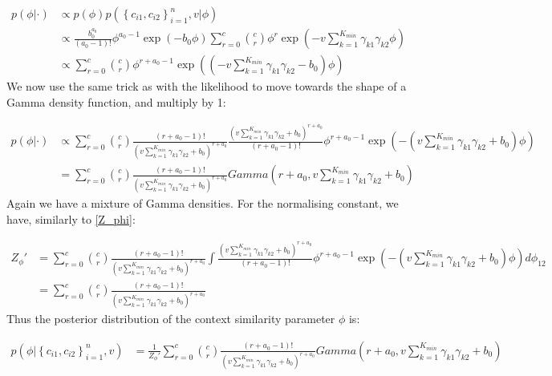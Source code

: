 \documentclass[11pt]{article} %
\begin{document}
\begin{align}
p(\phi | \cdot) &\propto p(\phi) p(\left\{c_{i1}, c_{i2}\right\}_{i=1}^n, v | \phi)  \\
&\propto \frac{b_0^{a_0}}{(a_0 - 1)!}\phi^{a_0 - 1}\exp\left(-b_0 \phi \right)  \sum_{r=0}^c  \binom{c}{r}\phi^r \exp\left(-v \sum_{k=1}^{K_{min}} \gamma_{k1} \gamma_{k2}\phi\right) \\
&\propto \sum_{r=0}^c  \binom{c}{r} \phi^{r + a_0 - 1} \exp \left( \left(-v \sum_{k=1}^{K_{min}} \gamma_{k1} \gamma_{k2}  -b_0 \right)\phi\right)
\end{align}
We now use the same trick as with the likelihood to move towards the shape of a Gamma density function, and multiply by 1:

\begin{align}
p(\phi | \cdot) &\propto \sum_{r=0}^c  \binom{c}{r} \frac{(r + a_0 - 1)!}{ \left(v \sum_{k=1}^{K_{min}} \gamma_{k1} \gamma_{k2} + b_0 \right)^{r + a_0}} \frac{ \left(v \sum_{k=1}^{K_{min}} \gamma_{k1} \gamma_{k2} + b_0 \right)^{r + a_0}}{(r + a_0 - 1)!} \phi^{r + a_0 - 1} \exp \left( - \left(v \sum_{k=1}^{K_{min}} \gamma_{k1} \gamma_{k2} + b_0 \right)\phi\right) \\
&= \sum_{r=0}^c  \binom{c}{r} \frac{(r + a_0 - 1)!}{ \left(v \sum_{k=1}^{K_{min}} \gamma_{k1} \gamma_{k2} + b_0 \right)^{r + a_0}} Gamma \left(r+ a_0, v \sum_{k=1}^{K_{min}} \gamma_{k1} \gamma_{k2} + b_0 \right)
\end{align}
Again we have a mixture of Gamma densities. For the normalising constant, we have, similarly to \eqref{Z_phi}:

\begin{align}
Z_{\phi}' &=\sum_{r=0}^c  \binom{c}{r} \frac{(r + a_0 - 1)!}{ \left(v \sum_{k=1}^{K_{min}} \gamma_{k1} \gamma_{k2} + b_0 \right)^{r + a_0}}  \int \frac{ \left(v \sum_{k=1}^{K_{min}} \gamma_{k1} \gamma_{k2} + b_0 \right)^{r + a_0}}{(r + a_0 - 1)!} \phi^{r + a_0 - 1} \exp \left( - \left(v \sum_{k=1}^{K_{min}} \gamma_{k1} \gamma_{k2} + b_0 \right)\phi\right) d\phi_{12} \\
&= \sum_{r=0}^c \binom{c}{r} \frac{(r + a_0 - 1)!}{ \left(v \sum_{k=1}^{K_{min}} \gamma_{k1} \gamma_{k2} + b_0 \right)^{r + a_0}} 
\end{align}
Thus the posterior distribution of the context similarity parameter $\phi$ is:

\begin{align}
p(\phi |  \left\{c_{i1}, c_{i2}\right\}_{i=1}^n, v) &=  \frac{1}{Z_{\phi}'} \sum_{r=0}^c  \binom{c}{r} \frac{(r + a_0 - 1)!}{ \left(v \sum_{k=1}^{K_{min}} \gamma_{k1} \gamma_{k2} + b_0 \right)^{r + a_0}} Gamma \left(r+ a_0, v \sum_{k=1}^{K_{min}} \gamma_{k1} \gamma_{k2} + b_0 \right)
\end{align}
\end{document}
